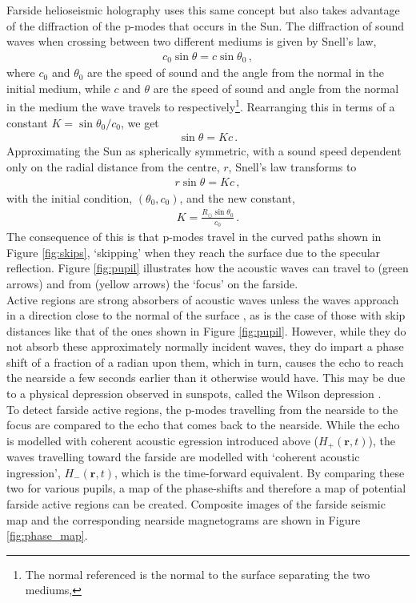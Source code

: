 \documentclass[11pt,a4paper,onecolumn]{report}
\begin{document}
Farside helioseismic holography uses this same concept but also takes advantage of
the diffraction of the p-modes that occurs in the Sun. The diffraction of sound
waves when crossing between two different mediums is given by Snell's law,
\begin{align}
  c_0 \sin \theta = c \sin \theta_0 \,,
\end{align}
where \(c_0\) and \(\theta_0\) are the speed of sound and the angle from the normal
in the initial medium, while \(c\) and \(\theta\) are the speed of sound and
angle from the normal in the medium the wave travels to
respectively\footnote{The normal referenced is the normal to the surface
separating the two mediums,}. Rearranging this in terms of a constant \(K = \sin
\theta_0 / c_0 \), we get
\begin{align}
  \sin \theta = Kc \,.
\end{align}
Approximating the Sun as spherically symmetric, with a sound speed dependent
only on the radial distance from the centre, \(r\), Snell's law transforms to
\begin{align}
  r\sin \theta = Kc \,,
\end{align}
with the initial condition, \((\theta_0, c_0)\), and the new constant,
\begin{align}
  K = \frac{R_\odot \sin \theta_0}{c_0}\,.
\end{align}
The consequence of this is that p-modes travel in the curved paths shown in
Figure \ref{fig:skips}, `skipping' when they reach the surface due to the
specular reflection. Figure \ref{fig:pupil} illustrates how the acoustic waves
can travel to (green arrows) and from (yellow arrows) the `focus' on the
farside. \\

Active regions are strong absorbers of acoustic waves unless the waves approach
in a direction close to the normal of the surface \citep{Braun1989,
lindsey_seismic_2000, braun_surface-focused_2008}, as is the case of those with
skip distances like that of the ones shown in Figure \ref{fig:pupil}. However,
while they do not absorb these approximately normally incident waves, they do
impart a phase shift of a fraction of a radian upon them, which in turn, causes
the echo to reach the nearside a few seconds earlier than it otherwise would
have. This may be due to a physical depression observed in sunspots, called
the Wilson depression \citep{Lindsey_2010}.\\

To detect farside active regions, the p-modes travelling
from the nearside to the focus are compared to the echo that comes back to the
nearside. While the echo is modelled with coherent acoustic egression introduced
above (\(H_+(\bm{r}, t)\)), the waves travelling toward the farside are modelled with
`coherent acoustic ingression', \(H_-(\bm{r}, t)\), which is the time-forward
equivalent. By comparing these two for various pupils, a map of the phase-shifts
and therefore a map of potential farside active regions can be created.
Composite images of the farside seismic map and the corresponding nearside
magnetograms are shown in Figure \ref{fig:phase_map}.\\
\end{document}
